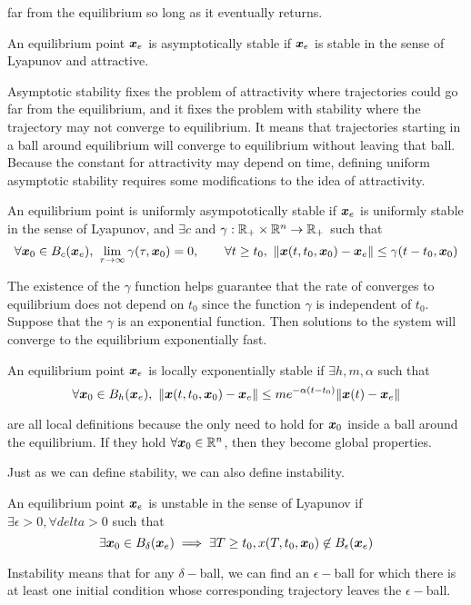 far from the equilibrium so long as it eventually returns.
\begin{definition}
	An equilibrium point $\boldsymbol{x}_e$ is asymptotically stable if $\boldsymbol{x}_e$ is
	stable in the sense of Lyapunov and attractive.
	\label{defn:asymptotic-stability}
\end{definition}
Asymptotic stability fixes the problem of attractivity where trajectories could
go far from the equilibrium, and it fixes the problem with stability where the
trajectory may not converge to equilibrium. It means that trajectories starting
in a ball around equilibrium will converge to equilibrium without leaving that
ball. Because the constant for attractivity may depend on time, defining
uniform asymptotic stability requires some modifications to the idea of
attractivity.
\begin{definition}
	An equilibrium point is uniformly asympototically stable if $\boldsymbol{x}_e$ is
	uniformly stable in the sense of Lyapunov, and $\exists c$ and
	$\gamma:\mathbb{R}_+\times\mathbb{R}^n\to\mathbb{R}_+$ such that \[
		\forall \bs{x}_0\in B_c(\bs{x}_e),\ \lim_{\tau\to\infty}\gamma(\tau,
		\bs{x}_0) = 0, \qquad \forall t\geq t_0,\ \|\bs{x}(t, t_0, \bs{x}_0) - \bs{x}_e\| \leq
		\gamma(t-t_0, \bs{x}_0)
	\]
	\label{defn:uniform-asymptotic-stability}
\end{definition}
The existence of the $\gamma$ function helps guarantee that the rate of
converges to equilibrium does not depend on $t_0$ since the function $\gamma$ is
independent of $t_0$.
Suppose that the $\gamma$ is an exponential function. Then solutions to the
system will converge to the equilibrium exponentially fast.
\begin{definition}
	An equilibrium point $\boldsymbol{x}_e$ is locally exponentially stable if $\exists
	h,m,\alpha$
	such that \[
		\forall \boldsymbol{x}_0\in B_h(\boldsymbol{x}_e),\ \|\boldsymbol{x}(t, t_0, \boldsymbol{x}_0) -
		\boldsymbol{x}_e\| \leq me^{-\alpha(t - t_0)}\|\boldsymbol{x}(t) - \boldsymbol{x}_e\|
	\]
	\label{defn:exponential-stability}
\end{definition}
are all local definitions because the only need to hold for $\boldsymbol{x}_0$ inside a
ball around the equilibrium. If they hold $\forall \boldsymbol{x}_0\in\mathbb{R}^n$, then they
become global properties.

Just as we can define stability, we can also define instability.
\begin{definition}
	An equilibrium point $\boldsymbol{x}_e$ is unstable in the sense of Lyapunov if
	$\exists \epsilon > 0, \forall delta > 0$ such that \[
		\exists \boldsymbol{x}_0\in B_\delta(\boldsymbol{x}_e) \implies \exists T\geq t_0, x(T, t_0,
		\boldsymbol{x}_0) \not\in B_\epsilon(\boldsymbol{x}_e)
	\]
	\label{defn:unstable}
\end{definition}
Instability means that for any $\delta-$ball, we can find an $\epsilon-$ball for
which there is at least one initial condition whose corresponding trajectory
leaves the $\epsilon-$ball.
